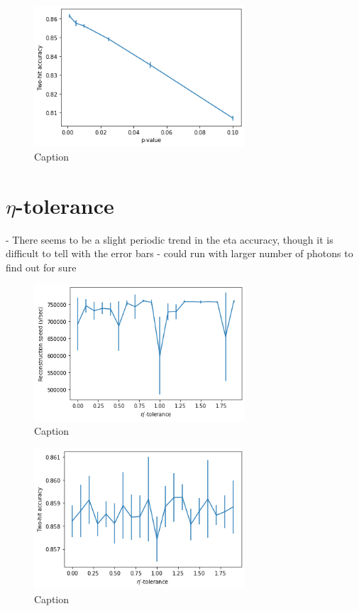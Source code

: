 \begin{figure}
    \centering
    \includegraphics[width=0.7\textwidth]{graphs/pi_p_acc.png}
    \caption{Caption}
    \label{fig:my_label}
\end{figure}

\section{$\eta$-tolerance}
- There seems to be a slight periodic trend in the eta accuracy, though it is difficult to tell with the error bars
- could run with larger number of photons to find out for sure

\begin{figure}
    \centering
    \includegraphics[width=0.7\textwidth]{graphs/pi_eta_speed.png}
    \caption{Caption}
    \label{fig:my_label}
\end{figure}

\begin{figure}
    \centering
    \includegraphics[width=0.7\textwidth]{graphs/pi_eta_acc.png}
    \caption{Caption}
    \label{fig:my_label}
\end{figure}

